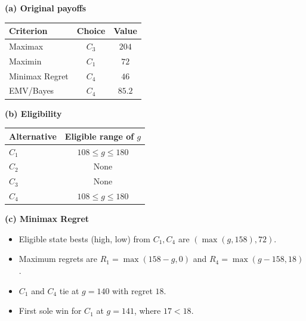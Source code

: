 {\noindent\begin{minipage}[t]{0.35\textwidth}
  \vspace{0pt}
  \textbf{(a) Original payoffs}\par\smallskip
  \setlength{\tabcolsep}{3pt}
  \begin{tabular}{@{}lcc@{}}
    \toprule
    Criterion & Choice & Value\\ \midrule
    Maximax & $C_3$ & $204$\\
    Maximin & $C_1$ & $72$\\
    Minimax Regret & $C_4$ & $46$\\
    EMV/Bayes & $C_4$ & $85.2$\\
    \bottomrule
  \end{tabular}
\end{minipage}\hfill
\begin{minipage}[t]{0.62\textwidth}
  \vspace{0pt}
  \textbf{(b) Eligibility}\par\smallskip
  \begin{tabular}{@{}lc@{}}
    \toprule
    Alternative & Eligible range of $g$\\ \midrule
    $C_1$ & $108\le g\le180$\\
    $C_2$ & None\\
    $C_3$ & None\\
    $C_4$ & $108\le g\le180$\\
    \bottomrule
  \end{tabular}\par\smallskip
  \textbf{(c) Minimax Regret}
  \begin{itemize}[leftmargin=*,nosep]
    \item Eligible state bests (high, low) from $C_1,C_4$ are $(\max(g,158),72)$.
    \item Maximum regrets are $R_1=\max(158-g,0)$ and $R_4=\max(g-158,18)$.
    \item $C_1$ and $C_4$ tie at $g=140$ with regret $18$.
    \item First sole win for $C_1$ at $\boxed{g=141}$, where $17<18$.
  \end{itemize}
\end{minipage}

}

